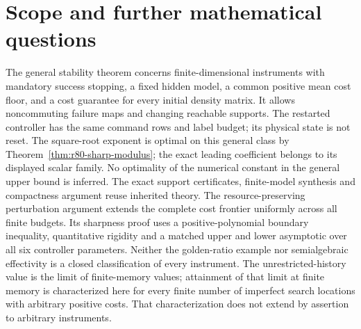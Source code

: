 \maketitle

















\section{Scope and further mathematical questions}
\label{sec:r73-scope}\label{sec:r74-scope}\label{sec:r75-scope}\label{sec:r76-scope}\label{sec:r77-scope}\label{sec:r78-scope}\label{sec:r79-scope}\label{sec:r80-scope}
The general stability theorem concerns finite-dimensional instruments
with mandatory success stopping, a fixed hidden model, a common positive
mean cost floor, and a cost guarantee for every initial density matrix.
It allows noncommuting failure maps and changing reachable supports.
The restarted controller has the same command rows and label budget;
its physical state is not reset.  The square-root exponent is optimal on this general class by
Theorem~\ref{thm:r80-sharp-modulus}; the exact leading coefficient
belongs to its displayed scalar family.  No optimality of the numerical
constant in the general upper bound is inferred.  The exact support
certificates, finite-model synthesis and compactness argument reuse
inherited theory.  The resource-preserving perturbation argument extends the complete
cost frontier uniformly across all finite budgets.  Its sharpness proof
uses a positive-polynomial boundary inequality, quantitative rigidity and
a matched upper and lower asymptotic over all six controller parameters.
Neither the golden-ratio example nor semialgebraic effectivity is a
closed classification of every instrument.  The unrestricted-history
value is the limit of finite-memory values; attainment of that limit
at finite memory is characterized here for every finite number of
imperfect search locations with arbitrary positive costs.  That characterization
does not extend by assertion to arbitrary instruments.


